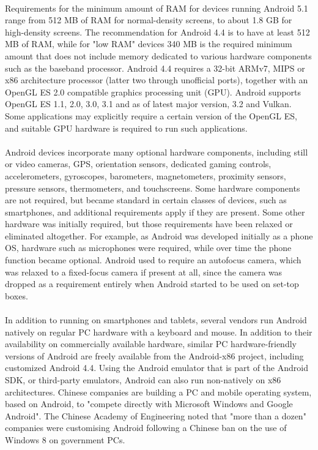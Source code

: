\documentclass[a4paper,12pt]{report}
\begin{document}
\paragraph{}Requirements for the minimum amount of RAM for devices running Android 5.1 range from 512 MB of RAM for normal-density screens, to about 1.8 GB for high-density screens. The recommendation for Android 4.4 is to have at least 512 MB of RAM, while for "low RAM" devices 340 MB is the required minimum amount that does not include memory dedicated to various hardware components such as the baseband processor. Android 4.4 requires a 32-bit ARMv7, MIPS or x86 architecture processor (latter two through unofficial ports), together with an OpenGL ES 2.0 compatible graphics processing unit (GPU). Android supports OpenGL ES 1.1, 2.0, 3.0, 3.1 and as of latest major version, 3.2 and Vulkan. Some applications may explicitly require a certain version of the OpenGL ES, and suitable GPU hardware is required to run such applications.
\paragraph{}Android devices incorporate many optional hardware components, including still or video cameras, GPS, orientation sensors, dedicated gaming controls, accelerometers, gyroscopes, barometers, magnetometers, proximity sensors, pressure sensors, thermometers, and touchscreens. Some hardware components are not required, but became standard in certain classes of devices, such as smartphones, and additional requirements apply if they are present. Some other hardware was initially required, but those requirements have been relaxed or eliminated altogether. For example, as Android was developed initially as a phone OS, hardware such as microphones were required, while over time the phone function became optional. Android used to require an autofocus camera, which was relaxed to a fixed-focus camera if present at all, since the camera was dropped as a requirement entirely when Android started to be used on set-top boxes.
\paragraph{}In addition to running on smartphones and tablets, several vendors run Android natively on regular PC hardware with a keyboard and mouse. In addition to their availability on commercially available hardware, similar PC hardware-friendly versions of Android are freely available from the Android-x86 project, including customized Android 4.4. Using the Android emulator that is part of the Android SDK, or third-party emulators, Android can also run non-natively on x86 architectures. Chinese companies are building a PC and mobile operating system, based on Android, to "compete directly with Microsoft Windows and Google Android". The Chinese Academy of Engineering noted that "more than a dozen" companies were customising Android following a Chinese ban on the use of Windows 8 on government PCs.
\end{document}
